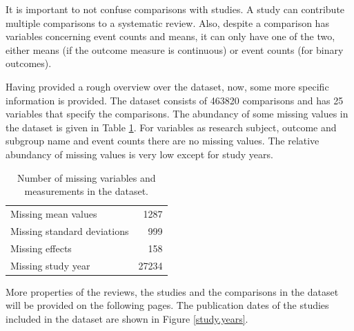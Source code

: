 \documentclass[11pt,a4paper,twoside]{book}\usepackage[]{graphicx}\usepackage[]{color}
\begin{document}


It is important to not confuse comparisons with studies. A study can contribute multiple comparisons to a systematic review. Also, despite a comparison has variables concerning event counts and means, it can only have one of the two, either means (if the outcome measure is continuous) or event counts (for binary outcomes).

\vspace{0mm}
Having provided a rough overview over the dataset, now, some more specific information is provided. The dataset consists of 463820 comparisons and has 25 variables that specify the comparisons. The abundancy of some missing values in the dataset is given in Table \ref{missing}. For variables as research subject, outcome and subgroup name and event counts there are no missing values. The relative abundancy of missing values is very low except for study years.



\begin{table}[ht]
\centering
\begingroup\footnotesize
\begin{tabular}{lr}
  \hline
  \hline
Missing mean values & 1287 \\ 
  Missing standard deviations & 999 \\ 
  Missing effects & 158 \\ 
  Missing study year & 27234 \\ 
   \hline
\end{tabular}
\endgroup
\caption{Number of missing variables and measurements in the dataset.} 
\label{missing}
\end{table}



More properties of the reviews, the studies and the comparisons in the dataset will be provided on the following pages. The publication dates of the studies included in the dataset are shown in Figure \ref{study.years}. 
\end{document}
